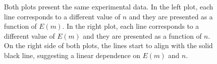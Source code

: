 \documentclass[twoside,11pt]{article}
\begin{document}
 
\begin{figure}[!ht]
  \centering
  \caption{Both plots present the same experimental data.  In the left plot, each  line corresponds to a different value of $n$ and they are presented as a function of $E(m)$.  In the right plot, each  line corresponds to a different value of $E(m)$ and they are presented as a function of $n$.  On the right side of both plots, the lines start to align with the solid black line, suggesting a linear dependence on $E(m)$ and $n$.  
  }
  \label{fig1}
\end{figure}


%
\end{document}
